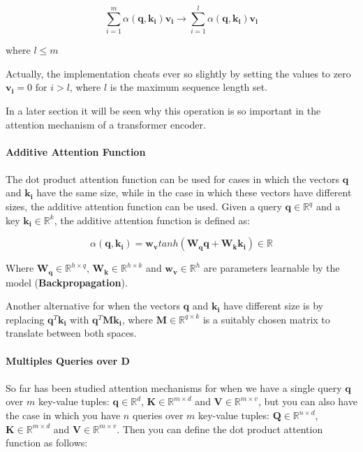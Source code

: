 \begin{equation}
    \sum_{i=1}^{m} \alpha (\mathbf{q},\mathbf{k_{i}})\mathbf{v_{i}} \rightarrow \sum_{i=1}^{l} \alpha (\mathbf{q},\mathbf{k_{i}})\mathbf{v_{i}}
\end{equation}

where $l \leq m$

Actually, the implementation cheats ever so slightly by setting the values to zero $\mathbf{v_{i}} = 0 \text{ for } i > l$, where $l$ is the maximum sequence length set. 

In a later section it will be seen why this operation is so important in the attention mechanism of a transformer encoder.
\\\\
\textbf{Additive Attention Function}
\\\\
The dot product attention function can be used for cases in which the vectors $\mathbf{q}$ and $\mathbf{k_i}$ have the same size, while in the case in which these vectors have different sizes, the additive attention function can be used.  Given a query $\mathbf{q} \in \mathbb{R}^q$ and a key $\mathbf{k_i} \in \mathbb{R}^k$, the additive attention function is defined as:

\begin{equation}
    \alpha (\mathbf{q},\mathbf{k_{i}})=\mathbf{w_{v}}tanh(\mathbf{W_{q}}\mathbf{q}+\mathbf{W_{k}}\mathbf{k_{i}}) \in \mathbb{R}
\end{equation}

Where $\mathbf{W_{q}} \in \mathbb{R}^{h\times q}$, $\mathbf{W_{k}} \in \mathbb{R}^{h\times k}$ and $\mathbf{w_{v}} \in \mathbb{R}^{h}$ are parameters learnable by the model (\textbf{Backpropagation}).

Another alternative for when the vectors $\mathbf{q}$ and $\mathbf{k_i}$ have different size is by replacing $\mathbf{q}^{T}\mathbf{k_{i}}$ with $\mathbf{q}^{T}\mathbf{M}\mathbf{k_{i}}$, where $\mathbf{M}\in \mathbb{R}^{q\times k}$ is a suitably chosen matrix to translate between both spaces.
\\\\
\textbf{Multiples Queries over $\mathbf{D}$}
\\\\
So far has been studied attention mechanisms for when we have a single query $\mathbf{q}$ over $m$ key-value tuples: $\mathbf{q} \in \mathbb{R}^{d}$, $\mathbf{K} \in \mathbb{R}^{m\times d}$ and $\mathbf{V} \in \mathbb{R}^{m\times v}$, but you can also have the case in which you have $n$ queries over $m$ key-value tuples: $\mathbf{Q} \in \mathbb{R}^{n \times d}$, $\mathbf{K} \in \mathbb{R}^{m\times d}$ and $\mathbf{V} \in \mathbb{R}^{m\times v}$. Then you can define the dot product attention function as follows:

